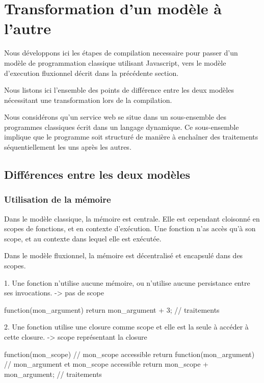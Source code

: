 \section{Transformation d'un modèle à l'autre}

	Nous développons ici les étapes de compilation necessaire pour passer d'un modèle de programmation classique utilisant Javascript, vers le modèle d'execution fluxionnel décrit dans la précédente section.

	Nous listons ici l'ensemble des points de différence entre les deux modèles nécessitant une transformation lors de la compilation.

	Nous considérons qu'un service web se situe dans un sous-ensemble des programmes classiques écrit dans un langage dynamique.
	Ce sous-ensemble implique que le programme soit structuré de manière à enchaîner des traitements séquentiellement les uns après les autres.

	\subsection{Différences entre les deux modèles}

		\subsubsection{Utilisation de la mémoire}

			Dans le modèle classique, la mémoire est centrale.
			Elle est cependant cloisonné en scopes de fonctions, et en contexte d'exécution.
			Une fonction n'as accès qu'à son scope, et au contexte dans lequel elle est exécutée.

			Dans le modèle fluxionnel, la mémoire est décentralisé et encapsulé dans des scopes.

			1. Une fonction n'utilise aucune mémoire, ou n'utilise aucune persistance entre ses invocations.
			    -> pas de scope

			\begin{code}
				function(mon_argument) {
				    return mon_argument + 3; // traitements
				}
			\end{code}


			2. Une fonction utilise une closure comme scope et elle est la seule à accéder à cette closure.
			    -> scope représentant la closure

			\begin{code}
				function(mon_scope) {
				    // mon_scope accessible
				    return function(mon_argument) {
				        // mon_argument et mon_scope accessible
				        return mon_scope + mon_argument; // traitements
				    }
				}
			\end{code}

